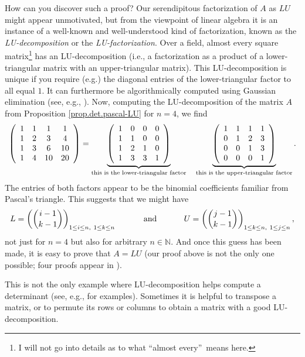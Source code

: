 How can you discover such a proof? Our serendipitous factorization of $A$ as
$LU$ might appear unmotivated, but from the viewpoint of linear algebra it is
an instance of a well-known and well-understood kind of factorization, known
as the \emph{LU-decomposition} or the \emph{LU-factorization}. Over a field,
almost every square matrix\footnote{I will not go into details as to what
\textquotedblleft almost every\textquotedblright\ means here.} has an
LU-decomposition (i.e., a factorization as a product of a lower-triangular
matrix with an upper-triangular matrix). This LU-decomposition is unique if
you require (e.g.) the diagonal entries of the lower-triangular factor to all
equal $1$. It can furthermore be algorithmically computed using Gaussian
elimination (see, e.g., \cite[\S 1.3, Theorem 1.3]{OlvSha}). Now, computing
the LU-decomposition of the matrix $A$ from Proposition
\ref{prop.det.pascal-LU} for $n=4$, we find%
\[
\left(
\begin{array}
[c]{cccc}%
1 & 1 & 1 & 1\\
1 & 2 & 3 & 4\\
1 & 3 & 6 & 10\\
1 & 4 & 10 & 20
\end{array}
\right)  =\underbrace{\left(
\begin{array}
[c]{cccc}%
1 & 0 & 0 & 0\\
1 & 1 & 0 & 0\\
1 & 2 & 1 & 0\\
1 & 3 & 3 & 1
\end{array}
\right)  }_{\text{this is the lower-triangular factor}}%
\ \ \ \underbrace{\left(
\begin{array}
[c]{cccc}%
1 & 1 & 1 & 1\\
0 & 1 & 2 & 3\\
0 & 0 & 1 & 3\\
0 & 0 & 0 & 1
\end{array}
\right)  }_{\text{this is the upper-triangular factor}}.
\]
The entries of both factors appear to be the binomial coefficients familiar
from Pascal's triangle. This suggests that we might have%
\[
L=\left(  \dbinom{i-1}{k-1}\right)  _{1\leq i\leq n,\ 1\leq k\leq
n}\ \ \ \ \ \ \ \ \ \ \text{and}\ \ \ \ \ \ \ \ \ \ U=\left(  \dbinom
{j-1}{k-1}\right)  _{1\leq k\leq n,\ 1\leq j\leq n},
\]
not just for $n=4$ but also for arbitrary $n\in\mathbb{N}$. And once this
guess has been made, it is easy to prove that $A=LU$ (our proof above is not
the only one possible; four proofs appear in \cite{EdelStrang}).

This is not the only example where LU-decomposition helps compute a
determinant (see, e.g., \cite[\S 2.6]{Krattenthaler} for examples). Sometimes
it is helpful to transpose a matrix, or to permute its rows or columns to
obtain a matrix with a good LU-decomposition.

